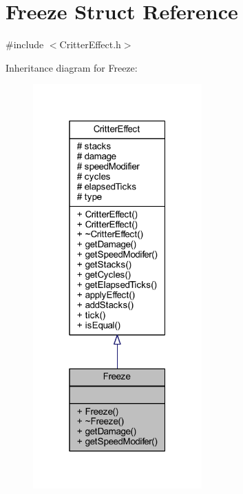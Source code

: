 \hypertarget{struct_freeze}{\section{Freeze Struct Reference}
\label{struct_freeze}
}


{\ttfamily \#include $<$Critter\+Effect.\+h$>$}



Inheritance diagram for Freeze\+:\nopagebreak
\begin{figure}[H]
\begin{center}
\leavevmode
\includegraphics[width=184pt]{struct_freeze__inherit__graph}
\end{center}
\end{figure}


